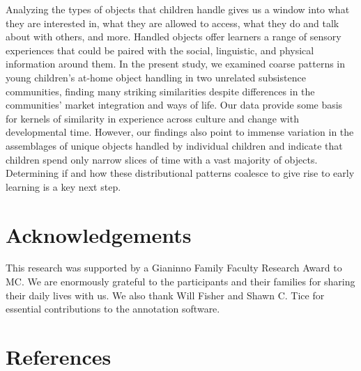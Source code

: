 \documentclass[10pt, letterpaper]{article}
\begin{document}
Analyzing the types of objects that children handle gives us a window
into what they are interested in, what they are allowed to access, what
they do and talk about with others, and more. Handled objects offer
learners a range of sensory experiences that could be paired with the
social, linguistic, and physical information around them. In the present
study, we examined coarse patterns in young children's at-home object
handling in two unrelated subsistence communities, finding many striking
similarities despite differences in the communities' market integration
and ways of life. Our data provide some basis for kernels of similarity
in experience across culture and change with developmental time.
However, our findings also point to immense variation in the assemblages
of unique objects handled by individual children and indicate that
children spend only narrow slices of time with a vast majority of
objects. Determining if and how these distributional patterns coalesce
to give rise to early learning is a key next step.

\vspace{1em}

\hypertarget{acknowledgements}{%
\section{Acknowledgements}\label{acknowledgements}}

This research was supported by a Gianinno Family Faculty Research Award
to MC. We are enormously grateful to the participants and their families
for sharing their daily lives with us. We also thank Will Fisher and
Shawn C. Tice for essential contributions to the annotation software.

\hypertarget{references}{%
\section{References}\label{references}}

\setlength{\parindent}{-0.1in} 
\setlength{\leftskip}{0.125in}

\noindent
\end{document}
